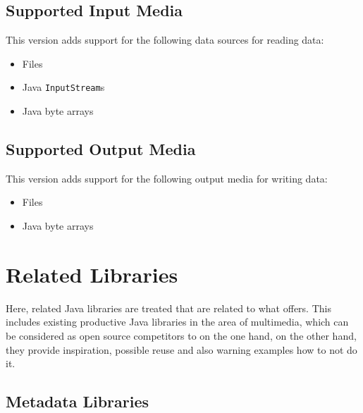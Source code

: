 \subsection{Supported Input Media}
\label{sec:UnterstuetzteEingabemedien}

This version adds support for the following data sources for reading data:
\begin{itemize}
\item Files
\item Java \texttt{InputStream}s
\item Java byte arrays
\end{itemize}


\subsection{Supported Output Media}
\label{sec:UnterstuetzteAusgabemedien}

This version adds support for the following output media for writing data:
\begin{itemize}
\item Files
\item Java byte arrays
\end{itemize}


\section{Related Libraries}
\label{sec:RelatedLibraries}

Here, related Java libraries are treated that are related to what \LibName{} offers. This includes existing productive Java libraries in the area of multimedia, which can be considered as open source competitors to \LibName{} on the one hand, on the other hand, they provide inspiration, possible reuse and also warning examples how to not do it.


\subsection{Metadata Libraries}
\label{sec:MetadataLibraries}

